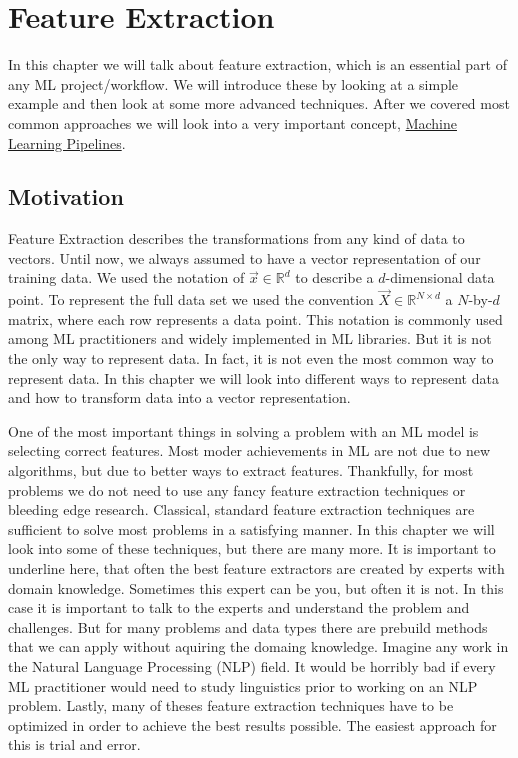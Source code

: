 \chapter{Feature Extraction}
\label{ch:feature-extraction}
In this chapter we will talk about feature extraction, which is an essential part of any ML project/workflow.
We will introduce these by looking at a simple example and then look at some more advanced techniques.
After we covered most common approaches we will look into a very important concept, \underline{Machine Learning Pipelines}.

\section{Motivation}
Feature Extraction describes the transformations from any kind of data to vectors.
Until now, we always assumed to have a vector representation of our training data.
We used the notation of $\vec{x} \in \mathbb{R}^d$ to describe a $d$-dimensional data point.
To represent the full data set we used the convention $\vec{X} \in \mathbb{R}^{N \times d}$ 
a $N$-by-$d$ matrix, where each row represents a data point. This notation is commonly used among ML practitioners
and widely implemented in ML libraries. But it is not the only way to represent data. In fact, it is not even the most common way to represent data.
In this chapter we will look into different ways to represent data and how to transform data into a vector representation.

One of the most important things in solving a problem with an ML model is selecting correct features.
Most moder achievements in ML are not due to new algorithms, but due to better ways to extract features.
Thankfully, for most problems we do not need to use any fancy feature extraction techniques or bleeding edge research.
Classical, standard feature extraction techniques are sufficient to solve most problems in a satisfying manner.
In this chapter we will look into some of these techniques, but there are many more.
It is important to underline here, that often the best feature extractors are created by experts with domain knowledge.
Sometimes this expert can be you, but often it is not. In this case it is important to talk to the experts and understand the problem and challenges.
But for many problems and data types there are prebuild methods that we can apply without aquiring the domaing knowledge.
Imagine any work in the Natural Language Processing (NLP) field. It would be horribly bad if every ML practitioner would need to study linguistics prior
to working on an NLP problem.
Lastly, many of theses feature extraction techniques have to be optimized in order to achieve the best results possible. The easiest approach for this is trial and error.

